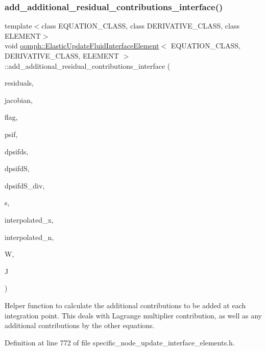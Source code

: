 \subsubsection{\texorpdfstring{add\+\_\+additional\+\_\+residual\+\_\+contributions\+\_\+interface()}{add\_additional\_residual\_contributions\_interface()}}
{\footnotesize\ttfamily template$<$class E\+Q\+U\+A\+T\+I\+O\+N\+\_\+\+C\+L\+A\+SS, class D\+E\+R\+I\+V\+A\+T\+I\+V\+E\+\_\+\+C\+L\+A\+SS, class E\+L\+E\+M\+E\+NT$>$ \\
void \hyperlink{classoomph_1_1ElasticUpdateFluidInterfaceElement}{oomph\+::\+Elastic\+Update\+Fluid\+Interface\+Element}$<$ E\+Q\+U\+A\+T\+I\+O\+N\+\_\+\+C\+L\+A\+SS, D\+E\+R\+I\+V\+A\+T\+I\+V\+E\+\_\+\+C\+L\+A\+SS, E\+L\+E\+M\+E\+NT $>$\+::add\+\_\+additional\+\_\+residual\+\_\+contributions\+\_\+interface (\begin{DoxyParamCaption}\item[{Vector$<$ double $>$ \&}]{residuals,  }\item[{Dense\+Matrix$<$ double $>$ \&}]{jacobian,  }\item[{const unsigned \&}]{flag,  }\item[{const Shape \&}]{psif,  }\item[{const D\+Shape \&}]{dpsifds,  }\item[{const D\+Shape \&}]{dpsifdS,  }\item[{const D\+Shape \&}]{dpsifd\+S\+\_\+div,  }\item[{const Vector$<$ double $>$ \&}]{s,  }\item[{const Vector$<$ double $>$ \&}]{interpolated\+\_\+x,  }\item[{const Vector$<$ double $>$ \&}]{interpolated\+\_\+n,  }\item[{const double \&}]{W,  }\item[{const double \&}]{J }\end{DoxyParamCaption})\hspace{0.3cm}{\ttfamily [inline]}}



Helper function to calculate the additional contributions to be added at each integration point. This deals with Lagrange multiplier contribution, as well as any additional contributions by the other equations. 



Definition at line 772 of file specific\+\_\+node\+\_\+update\+\_\+interface\+\_\+elements.\+h.

\mbox{\label{classoomph_1_1ElasticUpdateFluidInterfaceElement_ae9df6c11ccb63dc04c0d5ca655fe1482}} 

